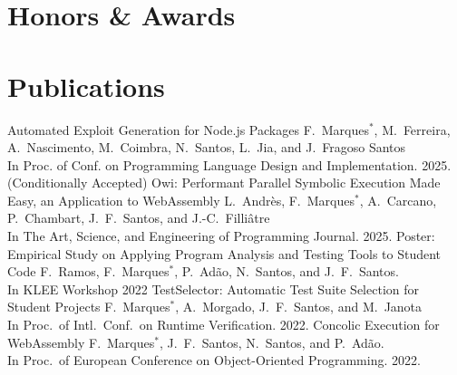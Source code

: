 \documentclass[11pt,a4paper,sans]{moderncv}   %
\begin{document}
\section{Honors \& Awards}


\section{Publications}
%
{Automated Exploit Generation for Node.js Packages}{}{}{}%
{F.\ Marques$^\ast$,
  M.\ Ferreira,
  A.\ Nascimento,
  M.\ Coimbra,
  N.\ Santos,
  L.\ Jia, and
  J.\ Fragoso Santos \\
In Proc. of Conf. on Programming Language Design and Implementation. 2025. (Conditionally Accepted)
}
%
%
%
{Owi: Performant Parallel Symbolic Execution Made Easy, an Application to WebAssembly}{}{}{}%
{L.\ Andr\`{e}s,
  F.\ Marques$^\ast$,
  A.\ Carcano,
  P.\ Chambart,
  J.\ F.\ Santos, and
  J.-C.\ Filli\^{a}tre \\
In The Art, Science, and Engineering of Programming Journal. 2025.
}
%
%
{Poster: Empirical Study on Applying Program Analysis and Testing Tools to Student Code}{}{}{}%
{F.\ Ramos,
  F.\ Marques$^\ast$,
  P.\ Ad\~ao,
  N.\ Santos, and
  J.\ F.\ Santos. \\
In KLEE Workshop 2022
}
%
%
{TestSelector: Automatic Test Suite Selection for Student Projects}{}{}{}%
{F.\ Marques$^\ast$,
  A.\ Morgado,
  J.\ F.\ Santos, and
  M.\ Janota \\
In Proc.\ of Intl.\ Conf.\ on Runtime Verification. 2022.
}
%
%
{Concolic Execution for WebAssembly}{}{}{}%
{F.\ Marques$^\ast$, J.\ F.\ Santos, N.\ Santos, and P.\ Ad\~ao.\\
In Proc.\ of European Conference on Object-Oriented Programming. 2022.
}
\end{document}
